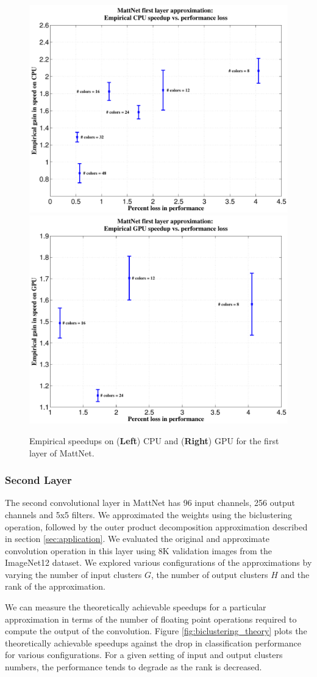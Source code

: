 \begin{figure}[t]
\centering
\begin{minipage}{0.75\textwidth}
      \includegraphics[width=0.5\linewidth]{img/layer1_CPUspeedup_vs_performance_loss.pdf}
	\quad\quad
      \includegraphics[width=0.5\linewidth]{img/layer1_GPUspeedup_vs_performance_loss.pdf}
\end{minipage}
\caption{Empirical speedups on ({\bf Left}) CPU and ({\bf Right}) GPU for the first layer of MattNet.}
\label{fig:mono_speedups}
\end{figure}

\subsubsection{Second Layer}
The second convolutional layer in MattNet has 96 input channels, 256 output channels and 5x5 filters. 
We approximated the weights using the biclustering operation,
followed by the outer product decomposition approximation described in section \ref{sec:application}.
We evaluated the original and approximate convolution operation in
this layer using 8K validation images from the ImageNet12 dataset. 
We explored various configurations of the approximations by varying the number of input clusters $G$, the number of output clusters $H$ and the rank of the approximation. 

We can measure the theoretically achievable speedups for a particular approximation in terms of the number of floating point operations required to compute the output of the convolution. Figure \ref{fig:biclustering_theory} plots the theoretically achievable speedups against the drop in classification performance for various configurations.  
For a given setting of input and output clusters numbers, the performance tends to degrade as the rank is decreased. 

